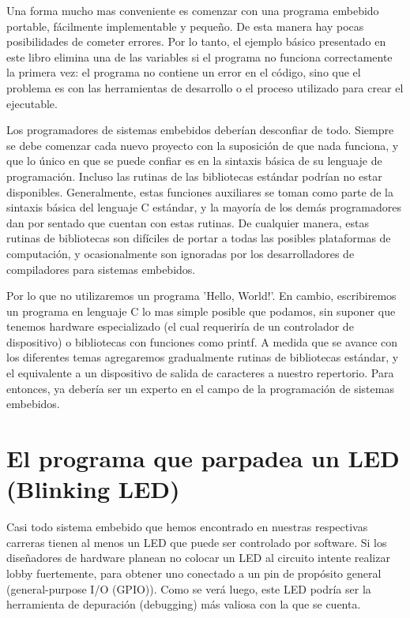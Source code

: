 \documentclass[12pt]{article}
\begin{document}
Una forma mucho mas conveniente es comenzar con una programa embebido portable,
fácilmente implementable y pequeño. De esta manera hay pocas posibilidades de
cometer errores. Por lo tanto, el ejemplo básico presentado en este libro elimina
una de las variables si el programa no funciona correctamente la primera vez:
el programa no contiene un error en el código, sino que el problema es con las
herramientas de desarrollo o el proceso utilizado para crear el ejecutable.


Los programadores de sistemas embebidos deberían desconfiar de todo. Siempre se debe comenzar cada nuevo proyecto con la 
suposición de que nada funciona, y que lo único en que se puede confiar 
es en la sintaxis básica de su lenguaje de programación.
Incluso las rutinas de las bibliotecas estándar podrían no estar disponibles.
Generalmente, estas funciones auxiliares se toman como parte de la
sintaxis básica del lenguaje C estándar, y la mayoría de los demás programadores dan por sentado que cuentan con estas rutinas. De cualquier manera, 
estas rutinas de bibliotecas son difíciles de portar a todas las posibles
plataformas de computación, y ocasionalmente son ignoradas
por los desarrolladores de compiladores para sistemas embebidos.

Por lo que no utilizaremos un programa 'Hello, World!'. En cambio, escribiremos
un programa en lenguaje C lo mas simple posible que podamos, sin suponer
que tenemos hardware especializado (el cual requeriría de un controlador de dispositivo) o bibliotecas con funciones como printf.
A medida que se avance con los diferentes temas agregaremos gradualmente
rutinas de bibliotecas estándar, y el equivalente a un dispositivo de 
salida de caracteres a nuestro repertorio.
Para entonces, ya debería ser un experto en el campo de la programación de sistemas
embebidos.

\section *{El programa que parpadea un LED (Blinking LED)}

Casi todo sistema embebido que hemos encontrado en nuestras respectivas
carreras tienen al menos un LED que puede ser controlado por software.
Si los diseñadores de hardware planean no colocar un LED al circuito intente
realizar lobby fuertemente, para obtener uno conectado a un pin de propósito
general (general-purpose I/O (GPIO)). Como se verá luego, este LED
podría ser la herramienta de depuración (debugging) más valiosa con la que
se cuenta.
\end{document}
